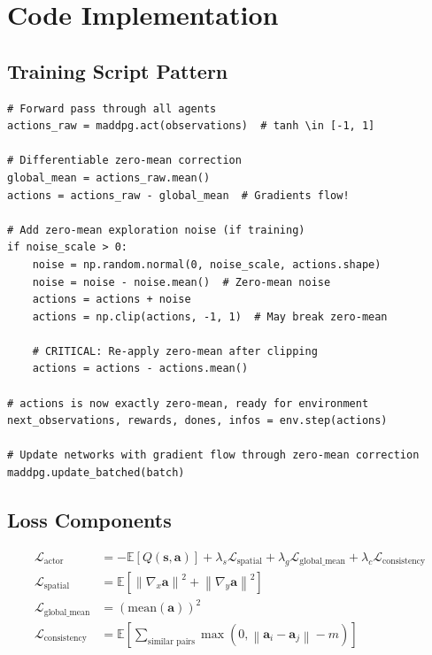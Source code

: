 \documentclass[11pt,a4paper]{article}
\newcommand{\E}{\mathbb{E}}
\newcommand{\norm}[1]{\left\|#1\right\|}
\theoremstyle{definition}
\begin{document}
\section{Code Implementation}

\subsection{Training Script Pattern}

\begin{verbatim}
# Forward pass through all agents
actions_raw = maddpg.act(observations)  # tanh \in [-1, 1]

# Differentiable zero-mean correction
global_mean = actions_raw.mean()
actions = actions_raw - global_mean  # Gradients flow!

# Add zero-mean exploration noise (if training)
if noise_scale > 0:
    noise = np.random.normal(0, noise_scale, actions.shape)
    noise = noise - noise.mean()  # Zero-mean noise
    actions = actions + noise
    actions = np.clip(actions, -1, 1)  # May break zero-mean

    # CRITICAL: Re-apply zero-mean after clipping
    actions = actions - actions.mean()

# actions is now exactly zero-mean, ready for environment
next_observations, rewards, dones, infos = env.step(actions)

# Update networks with gradient flow through zero-mean correction
maddpg.update_batched(batch)
\end{verbatim}

\subsection{Loss Components}

\begin{align}
    \mathcal{L}_{\text{actor}} &= -\E[Q(\mathbf{s}, \mathbf{a})] + \lambda_s \mathcal{L}_{\text{spatial}} + \lambda_g \mathcal{L}_{\text{global\_mean}} + \lambda_c \mathcal{L}_{\text{consistency}} \\
    \mathcal{L}_{\text{spatial}} &= \E\left[\norm{\nabla_x \mathbf{a}}^2 + \norm{\nabla_y \mathbf{a}}^2\right] \\
    \mathcal{L}_{\text{global\_mean}} &= \left(\text{mean}(\mathbf{a})\right)^2 \\
    \mathcal{L}_{\text{consistency}} &= \E\left[\sum_{\text{similar pairs}} \max(0, \norm{\mathbf{a}_i - \mathbf{a}_j} - m)\right]
\end{align}
\end{document}
